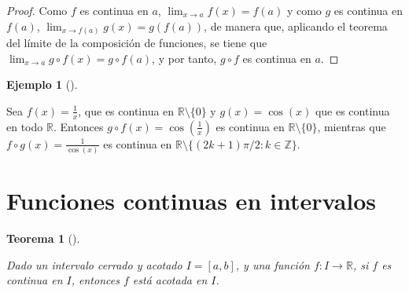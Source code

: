 \documentclass[
  a4paper,
]{scrreport}
\theoremstyle{plain}
\theoremstyle{plain}
\theoremstyle{definition}
\theoremstyle{definition}
\newtheorem{example}{Ejemplo}[chapter]
\theoremstyle{plain}
\newtheorem{theorem}{Teorema}[chapter]
\theoremstyle{remark}
\begin{document}
\begin{tcolorbox}[enhanced jigsaw, breakable, bottomrule=.15mm, coltitle=black, bottomtitle=1mm, opacityback=0, title=\textcolor{quarto-callout-note-color}{\faInfo}\hspace{0.5em}{Demostración}, left=2mm, toptitle=1mm, toprule=.15mm, opacitybacktitle=0.6, colframe=quarto-callout-note-color-frame, arc=.35mm, colback=white, rightrule=.15mm, titlerule=0mm, leftrule=.75mm, colbacktitle=quarto-callout-note-color!10!white]

\begin{proof}

Como \(f\) es continua en \(a\), \(\lim_{x\to a}f(x)=f(a)\) y como \(g\)
es continua en \(f(a)\), \(\lim_{x\to f(a)}g(x)=g(f(a))\), de manera
que, aplicando el teorema del límite de la composición de funciones, se
tiene que \(\lim_{x\to a}g\circ f(x)= g\circ f(a)\), y por tanto,
\(g\circ f\) es continua en \(a\).

\end{proof}

\end{tcolorbox}

\leavevmode{}%
\begin{example}[]\label{exm-continuidad-composicion-funciones}

Sea \(f(x)=\frac{1}{x}\), que es continua en
\(\mathbb{R}\setminus\{0\}\) y \(g(x)=\cos(x)\) que es continua en todo
\(\mathbb{R}\). Entonces \(g\circ f(x)=\cos\left(\frac{1}{x}\right)\) es
continua en \(\mathbb{R}\setminus\{0\}\), mientras que
\(f\circ g(x)=\frac{1}{\cos(x)}\) es continua en
\(\mathbb{R}\setminus\{(2k+1)\pi/2: k\in\mathbb{Z}\}\).

\end{example}

\hypertarget{funciones-continuas-en-intervalos}{%
\section{Funciones continuas en
intervalos}\label{funciones-continuas-en-intervalos}}

\leavevmode{}%
\begin{theorem}[]\label{thm-funcion-continua-intervalo-cerrado}

Dado un intervalo cerrado y acotado \(I=[a,b]\), y una función
\(f:I\to\mathbb{R}\), si \(f\) es continua en \(I\), entonces \(f\) está
acotada en \(I\).

\end{theorem}
\end{document}
